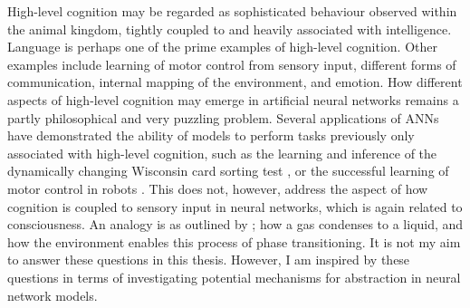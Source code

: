 High-level cognition may be regarded as sophisticated behaviour observed within the animal kingdom, tightly coupled to and heavily associated with intelligence. Language is perhaps one of the prime examples of high-level cognition. Other examples include learning of motor control from sensory input, different forms of communication, internal mapping of the environment, and emotion.
How different aspects of high-level cognition may emerge in artificial neural networks remains a partly philosophical and very puzzling problem. Several applications of ANNs have demonstrated the ability of models to perform tasks previously only associated with high-level cognition, such as the learning and inference of the dynamically changing Wisconsin card sorting test \citep{Maniadakis2012}, or the successful learning of motor control in robots \citep{Sugita2005, Yamashita2008, Tani2014}. 
This does not, however, address the aspect of how cognition is coupled to sensory input in neural networks, which is again related to consciousness. An analogy is as outlined by \cite{Freeman2003}; how a gas condenses to a liquid, and how the environment enables this process of phase transitioning.
It is not my aim to answer these questions in this thesis. However, I am inspired by these questions in terms of investigating potential mechanisms for abstraction in neural network models.
\\

